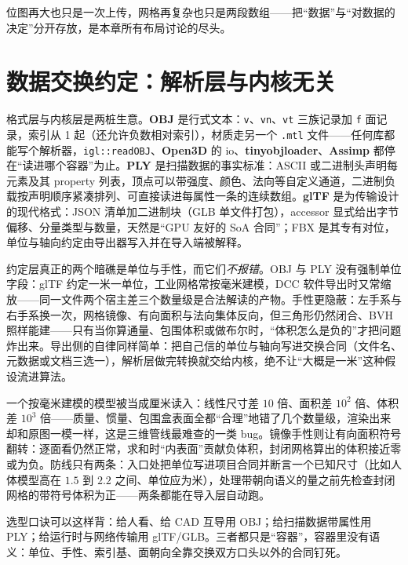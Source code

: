 \documentclass[12pt,a4paper,fontset=fandol]{ctexbook}
\newcommand{\Tp}[1]{\texttt{#1}}
\newcommand{\Lib}[1]{\textbf{#1}}
\begin{document}
位图再大也只是一次上传，网格再复杂也只是两段数组——把``数据''与``对数据的决定''分开存放，是本章所有布局讨论的尽头。

\section{数据交换约定：解析层与内核无关}

格式层与内核层是两桩生意。\textbf{OBJ} 是行式文本：\Tp{v}、\Tp{vn}、\Tp{vt} 三族记录加 \Tp{f} 面记录，索引从 1 起（还允许负数相对索引），材质走另一个 \Tp{.mtl} 文件——任何库都能写个解析器，\Tp{igl::readOBJ}、\Lib{Open3D} 的 io、\Lib{tinyobjloader}、\Lib{Assimp} 都停在``读进哪个容器''为止。\textbf{PLY} 是扫描数据的事实标准：ASCII 或二进制头声明每元素及其 property 列表，顶点可以带强度、颜色、法向等自定义通道，二进制负载按声明顺序紧凑排列、可直接读进每属性一条的连续数组。\textbf{glTF} 是为传输设计的现代格式：JSON 清单加二进制块（GLB 单文件打包），accessor 显式给出字节偏移、分量类型与数量，天然是``GPU 友好的 SoA 合同''；FBX 是其专有对位，单位与轴向约定由导出器写入并在导入端被解释。

约定层真正的两个暗礁是单位与手性，而它们\emph{不报错}。OBJ 与 PLY 没有强制单位字段：glTF 约定一米一单位，工业网格常按毫米建模，DCC 软件导出时又常缩放——同一文件两个宿主差三个数量级是合法解读的产物。手性更隐蔽：左手系与右手系换一次，网格镜像、有向面积与法向集体反向，但三角形仍然闭合、BVH 照样能建——只有当你算通量、包围体积或做布尔时，``体积怎么是负的''才把问题炸出来。导出侧的自律同样简单：把自己信的单位与轴向写进交换合同（文件名、元数据或文档三选一），解析层做完转换就交给内核，绝不让``大概是一米''这种假设流进算法。

\begin{note}[title={单位与手性：量级错却看起来对}]
一个按毫米建模的模型被当成厘米读入：线性尺寸差 $10$ 倍、面积差 $10^2$ 倍、体积差 $10^3$ 倍——质量、惯量、包围盒表面全都``合理''地错了几个数量级，渲染出来却和原图一模一样，这是三维管线最难查的一类 bug。镜像手性则让有向面积符号翻转：逐面看仍然正常，求和时``内表面''贡献负体积，封闭网格算出的体积接近零或为负。防线只有两条：入口处把单位写进项目合同并断言一个已知尺寸（比如人体模型高在 $1.5$ 到 $2.2$ 之间、单位应为米），处理带朝向语义的量之前先检查封闭网格的带符号体积为正——两条都能在导入层自动跑。
\end{note}

选型口诀可以这样背：给人看、给 CAD 互导用 OBJ；给扫描数据带属性用 PLY；给运行时与网络传输用 glTF/GLB。三者都只是``容器''，容器里没有语义：单位、手性、索引基、面朝向全靠交换双方口头以外的合同钉死。
\end{document}
